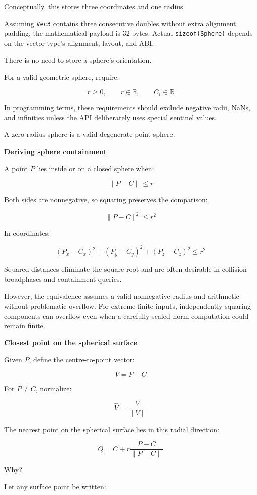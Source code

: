 Conceptually, this stores three coordinates and one radius.

Assuming \texttt{Vec3} contains three consecutive doubles without extra alignment padding, the mathematical payload is 32 bytes. Actual \texttt{sizeof(Sphere)} depends on the vector type's alignment, layout, and ABI.

There is no need to store a sphere's orientation.

For a valid geometric sphere, require:

\[
r\ge0,\qquad r\in\mathbb R,\qquad C_i\in\mathbb R
\]

In programming terms, these requirements should exclude negative radii, NaNs, and infinities unless the API deliberately uses special sentinel values.

A zero-radius sphere is a valid degenerate point sphere.

\textbf{Deriving sphere containment}

A point \(P\) lies inside or on a closed sphere when:

\[
\|P-C\|\le r
\]

Both sides are nonnegative, so squaring preserves the comparison:

\[
\boxed{\|P-C\|^2\le r^2}
\]

In coordinates:

\[
(P_x-C_x)^2+ (P_y-C_y)^2+ (P_z-C_z)^2\le r^2
\]

Squared distances eliminate the square root and are often desirable in collision broadphases and containment queries.

However, the equivalence assumes a valid nonnegative radius and arithmetic without problematic overflow. For extreme finite inputs, independently squaring components can overflow even when a carefully scaled norm computation could remain finite.

\textbf{Closest point on the spherical surface}

Given \(P\), define the centre-to-point vector:

\[
V=P-C
\]

For \(P\ne C\), normalize:

\[
\hat V=\frac{V}{\|V\|}
\]

The nearest point on the spherical surface lies in this radial direction:

\[
\boxed{ Q=C+r\frac{P-C}{\|P-C\|} }
\]

Why?

Let any surface point be written:

